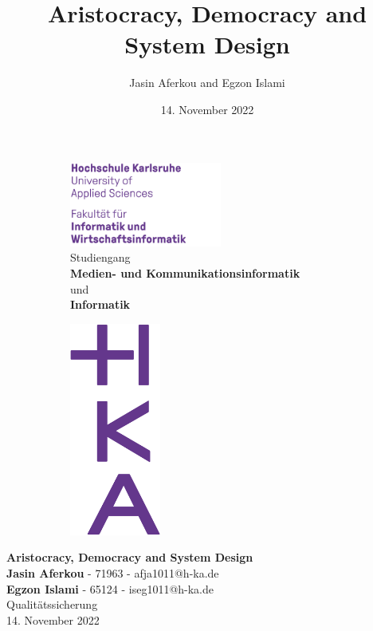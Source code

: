 \documentclass[a4paper, ngerman, 12pt, usenames, dvipsnames]{article}
\title{Aristocracy, Democracy and System Design}
\author{Jasin Aferkou and Egzon Islami}
\date{14. November 2022}
\begin{document}
\begin{titlepage}

    \begin{figure}[h]
        \begin{subfigure}[t]{10cm}
            \vskip 0pt
            \includegraphics[width=5cm,left]{images/HKA_IWI_Wortmarke_RGB.jpg}\\
            Studiengang\\
            \textbf{Medien- und Kommunikationsinformatik}\\
            und\\
            \textbf{Informatik}\\
        \end{subfigure}
        \begin{subfigure}[t]{3cm}
            \vskip 0pt
            \includegraphics[width=3cm,right]{images/HKA_IWI_Bildmarke_RGB.jpg}
        \end{subfigure}
    \end{figure}
    \begin{center}
        \Large
        \vspace{1cm}
        \huge
        \textbf{Aristocracy, Democracy and System Design}\\
        \vspace{2cm}
        \normalsize
        \textbf{Jasin Aferkou} - 71963 - afja1011@h-ka.de\\
        \textbf{Egzon Islami} - 65124 - iseg1011@h-ka.de\\
        
        \vspace{2cm}
        Qualitätssicherung\\
        \vspace{1.5cm}
        \small
        14. November 2022
    \end{center}
\end{titlepage}
\pagebreak
\end{document}
